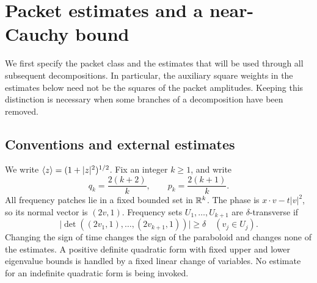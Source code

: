 \section{Packet estimates and a near-Cauchy bound}\label{p:section}

We first specify the packet class and the estimates that will be used through
all subsequent decompositions.  In particular, the auxiliary square weights
in the estimates below need not be the squares of the packet amplitudes.
Keeping this distinction is necessary when some branches of a decomposition
have been removed.

\subsection{Conventions and external estimates}

We write $\langle z\rangle=(1+|z|^2)^{1/2}$.
Fix an integer $k\geq1$, and write
\begin{equation}\label{p:exponents}
 q_k=\frac{2(k+2)}k,\qquad p_k=\frac{2(k+1)}k.
\end{equation}
All frequency patches lie in a fixed bounded set in $\mathbb R^k$.  The phase is
$x\cdot v-t|v|^2$, so its normal vector is $(2v,1)$.  Frequency sets
$U_1,\ldots,U_{k+1}$ are $\delta$-transverse if
\begin{equation}\label{p:transversality}
 \big|\det((2v_1,1),\ldots,(2v_{k+1},1))\big|\geq\delta
 \quad(v_j\in U_j).
\end{equation}
Changing the sign of time changes the sign of the paraboloid and changes none
of the estimates.  A positive definite quadratic form with fixed upper and
lower eigenvalue bounds is handled by a fixed linear change of variables.
No estimate for an indefinite quadratic form is being invoked.

